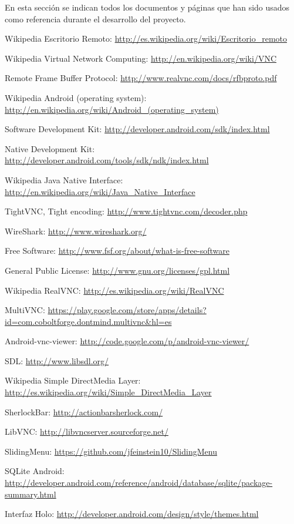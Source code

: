 En esta sección se indican todos los documentos y páginas que han sido usados como referencia durante el desarrollo del proyecto.

\begin{thebibliography}{11}

Wikipedia Escritorio Remoto: \url{http://es.wikipedia.org/wiki/Escritorio_remoto}

Wikipedia Virtual Network Computing: \url{http://en.wikipedia.org/wiki/VNC}

Remote Frame Buffer Protocol: \url{http://www.realvnc.com/docs/rfbproto.pdf}

Wikipedia Android (operating system): \url{http://en.wikipedia.org/wiki/Android_(operating_system)}

Software Development Kit:  \url{http://developer.android.com/sdk/index.html}

Native Development Kit: \url{http://developer.android.com/tools/sdk/ndk/index.html}

Wikipedia Java Native Interface: \url{http://en.wikipedia.org/wiki/Java_Native_Interface}

TightVNC, Tight encoding: \url{http://www.tightvnc.com/decoder.php}

WireShark: \url{http://www.wireshark.org/}

Free Software: \url{http://www.fsf.org/about/what-is-free-software}

General Public License: \url{http://www.gnu.org/licenses/gpl.html}

Wikipedia RealVNC: \url{http://es.wikipedia.org/wiki/RealVNC}

MultiVNC: \url{https://play.google.com/store/apps/details?id=com.coboltforge.dontmind.multivnc&hl=es}

Android-vnc-viewer: \url{http://code.google.com/p/android-vnc-viewer/}

SDL: \url{http://www.libsdl.org/}

Wikipedia Simple DirectMedia Layer: \url{http://es.wikipedia.org/wiki/Simple_DirectMedia_Layer}

SherlockBar: \url{http://actionbarsherlock.com/}

LibVNC: \url{http://libvncserver.sourceforge.net/}

SlidingMenu: \url{https://github.com/jfeinstein10/SlidingMenu}

SQLite Android: \url{http://developer.android.com/reference/android/database/sqlite/package-summary.html}

Interfaz Holo: \url{http://developer.android.com/design/style/themes.html}

\end{thebibliography} 
